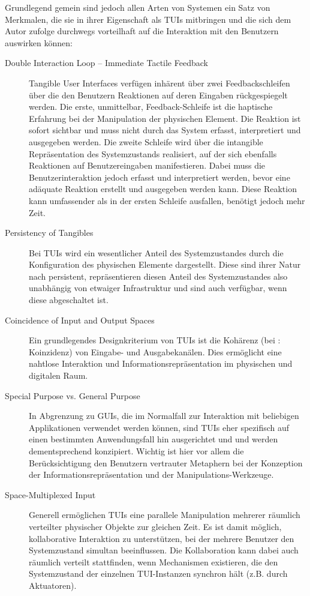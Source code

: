 Grundlegend gemein sind jedoch allen Arten von Systemen ein Satz von Merkmalen, die sie in ihrer Eigenschaft als \glspl{TUI} mitbringen und die sich dem Autor zufolge durchwegs vorteilhaft auf die Interaktion mit den Benutzern auswirken können:
\begin{description}
	\item[Double Interaction Loop -- Immediate Tactile Feedback] Tangible User Interfaces verfügen inhärent über zwei Feedbackschleifen über die den Benutzern Reaktionen auf deren Eingaben rückgespiegelt werden. Die erste, unmittelbar, Feedback-Schleife ist die haptische Erfahrung bei der Manipulation der physischen Element. Die Reaktion ist sofort sichtbar und muss nicht durch das System erfasst, interpretiert und ausgegeben werden. Die zweite Schleife wird über die intangible Repräsentation des Systemzustands realisiert, auf der sich ebenfalls Reaktionen auf Benutzereingaben manifestieren. Dabei muss die Benutzerinteraktion jedoch erfasst und interpretiert werden, bevor eine adäquate Reaktion erstellt und ausgegeben werden kann. Diese Reaktion kann umfassender als in der ersten Schleife ausfallen, benötigt jedoch mehr Zeit.
	\item[Persistency of Tangibles] Bei \glspl{TUI} wird ein wesentlicher Anteil des Systemzustandes durch die Konfiguration des physischen Elemente dargestellt. Diese sind ihrer Natur nach persistent, repräsentieren diesen Anteil des Systemzustandes also unabhängig von etwaiger Infrastruktur und sind auch verfügbar, wenn diese abgeschaltet ist.
	\item[Coincidence of Input and Output Spaces] Ein grundlegendes Designkriterium von \glspl{TUI} ist die Kohärenz (bei \citeauthor{Ishii08}: Koinzidenz) von Eingabe- und Ausgabekanälen. Dies ermöglicht eine nahtlose Interaktion und Informationsrepräsentation im physischen und digitalen Raum. 
	\item[Special Purpose vs. General Purpose] In Abgrenzung zu \glspl{GUI}, die im Normalfall zur Interaktion mit beliebigen Applikationen verwendet werden können, sind \glspl{TUI} eher spezifisch auf einen bestimmten Anwendungsfall hin ausgerichtet und und werden dementsprechend konzipiert. Wichtig ist hier vor allem die Berücksichtigung den Benutzern vertrauter Metaphern bei der Konzeption der Informationsrepräsentation und der Manipulations-Werkzeuge.
	\item[Space-Multiplexed Input] Generell ermöglichen \glspl{TUI} eine parallele Manipulation mehrerer räumlich verteilter physischer Objekte zur gleichen Zeit. Es ist damit möglich, kollaborative Interaktion zu unterstützen, bei der mehrere Benutzer den Systemzustand simultan beeinflussen. Die Kollaboration kann dabei auch räumlich verteilt stattfinden, wenn Mechanismen existieren, die den Systemzustand der einzelnen \gls{TUI}-Instanzen synchron hält (z.B. durch Aktuatoren). 
\end{description}

